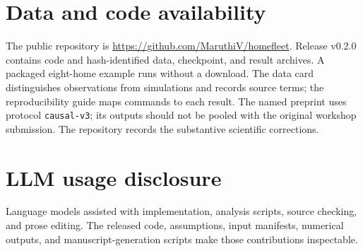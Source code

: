 \documentclass{article}
\begin{document}
\section*{Data and code availability}

The public repository is \url{https://github.com/MaruthiV/homefleet}. Release v0.2.0 contains code and hash-identified data, checkpoint, and result archives. A packaged eight-home example runs without a download. The data card distinguishes observations from simulations and records source terms; the reproducibility guide maps commands to each result. The named preprint uses protocol \texttt{causal-v3}; its outputs should not be pooled with the original workshop submission. The repository records the substantive scientific corrections.

\section*{LLM usage disclosure}

Language models assisted with implementation, analysis scripts, source checking, and prose editing. The released code, assumptions, input manifests, numerical outputs, and manuscript-generation scripts make those contributions inspectable.

\FloatBarrier

\setlength{\bibsep}{2pt}

\clearpage
\appendix

\end{document}
